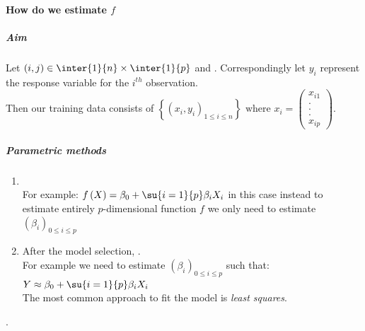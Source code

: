 \paragraph{How do we estimate $f$}
\subparagraph{Aim} Let $(i,j)\in\inter{1}{n}\times\inter{1}{p}$ and 
. Correspondingly let $y_{i}$ represent the response 
variable for the $i^{th}$ observation.\\
Then our training data consists of $\left\{ \left( x_{i},y_{i}
\right)_{1\leq i\leq n}\right\}\text{ where }x_{i}=\begin{pmatrix}
x_{i1}\\.\\.\\.\\x_{ip}\end{pmatrix}$.\\
\subparagraph{Parametric methods}
\begin{enumerate}
	\item {}\\ For
		example: $f\left( X \right)=\beta_{0}+\su{{i=1}}{p}
		\beta_{i}X_{i}$ in this case instead to estimate 
		entirely $p$-dimensional function $f$ we only need to
		estimate $\left( \beta_{i} \right)_{0\leq i\leq p}$
  \item After the model selection, .
    \\For example we need to estimate
    $\left( \beta_{i} \right)_{0\leq i\leq p}$ such that:
    $Y\approx\beta_{0}+\su{{i=1}}{p}\beta_{i}X_{i}$\\ The most common
    approach to fit the model is \emph{least squares}.
\end{enumerate}.
